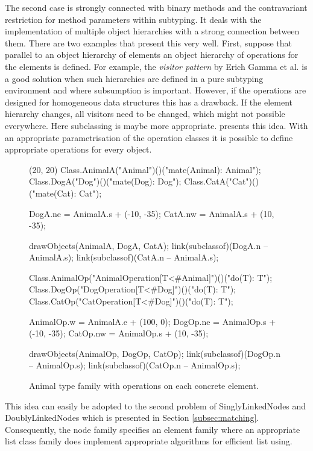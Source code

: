The second case is strongly connected with binary methods and the
contravariant restriction for method parameters within subtyping. It
deals with the implementation of multiple object hierarchies with a
strong connection between them. There are two examples that present
this very well. First, suppose that parallel to an object hierarchy
of elements an object hierarchy of operations for the elements is
defined. For example, the \emph{visitor pattern} by Erich Gamma et
al. \cite{gamma_design_1995} is a good solution when such hierarchies
are defined in a pure subtyping environment and where subsumption is
important. However, if the operations are designed for homogeneous data
structures this has a drawback. If the element hierarchy changes, all
visitors need to be changed, which might not possible everywhere. Here
subclassing is maybe more appropriate.  presents
this idea. With an appropriate parametrisation of the operation classes
it is possible to define appropriate operations for every object.

\begin{figure}[H]
	\centering
	\begin{emp}[classdiag](20, 20)
		Class.AnimalA("Animal")()("mate(Animal): Animal");
		Class.DogA("Dog")()("mate(Dog): Dog");
		Class.CatA("Cat")()("mate(Cat): Cat");

		DogA.ne = AnimalA.s + (-10, -35);
		CatA.nw = AnimalA.s + (10, -35);

		drawObjects(AnimalA, DogA, CatA);
		link(subclassof)(DogA.n -- AnimalA.s);
		link(subclassof)(CatA.n -- AnimalA.s);

		Class.AnimalOp("AnimalOperation[T<#Animal]")()("do(T): T");
		Class.DogOp("DogOperation[T<#Dog]")()("do(T): T");
		Class.CatOp("CatOperation[T<#Dog]")()("do(T): T");

		AnimalOp.w = AnimalA.e + (100, 0);
		DogOp.ne = AnimalOp.s + (-10, -35);
		CatOp.nw = AnimalOp.s + (10, -35);

		drawObjects(AnimalOp, DogOp, CatOp);
		link(subclassof)(DogOp.n -- AnimalOp.s);
		link(subclassof)(CatOp.n -- AnimalOp.s);
	\end{emp}
	\caption{Animal type family with operations on each concrete element.}
	\label{fig:operationFamily}
\end{figure}

This idea can easily be adopted to the second problem of SinglyLinkedNodes
and DoublyLinkedNodes which is presented in Section
\ref{subsec:matching}. Consequently, the node family specifies an element
family where an appropriate list class family does implement appropriate
algorithms for efficient list using.

